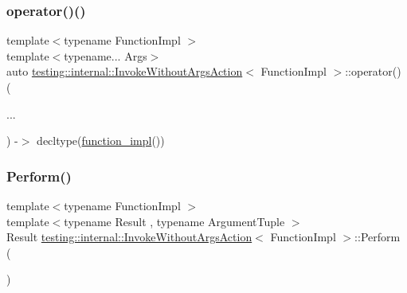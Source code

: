 \subsubsection{\texorpdfstring{operator()()}{operator()()}\hspace{0.1cm}{\footnotesize\ttfamily [2/2]}}
{\footnotesize\ttfamily template$<$typename Function\+Impl $>$ \\
template$<$typename... Args$>$ \\
auto \mbox{\hyperlink{structtesting_1_1internal_1_1_invoke_without_args_action}{testing\+::internal\+::\+Invoke\+Without\+Args\+Action}}$<$ Function\+Impl $>$\+::operator() (\begin{DoxyParamCaption}\item[{const \mbox{\hyperlink{namespacetesting_aaca153f67b689b8b9d5b8c67ecf8cee4}{Args}} \&}]{... }\end{DoxyParamCaption}) -\/$>$ decltype(\mbox{\hyperlink{structtesting_1_1internal_1_1_invoke_without_args_action_a60320725a70c43f3257264ffc905fd71}{function\+\_\+impl}}()) \hspace{0.3cm}{\ttfamily [inline]}}

\mbox{\label{structtesting_1_1internal_1_1_invoke_without_args_action_abdad2b7d19ff1cbd1d07a4bd585e3f4c}} 
\subsubsection{\texorpdfstring{Perform()}{Perform()}}
{\footnotesize\ttfamily template$<$typename Function\+Impl $>$ \\
template$<$typename Result , typename Argument\+Tuple $>$ \\
Result \mbox{\hyperlink{structtesting_1_1internal_1_1_invoke_without_args_action}{testing\+::internal\+::\+Invoke\+Without\+Args\+Action}}$<$ Function\+Impl $>$\+::Perform (\begin{DoxyParamCaption}\item[{const Argument\+Tuple \&}]{ }\end{DoxyParamCaption})\hspace{0.3cm}{\ttfamily [inline]}}



